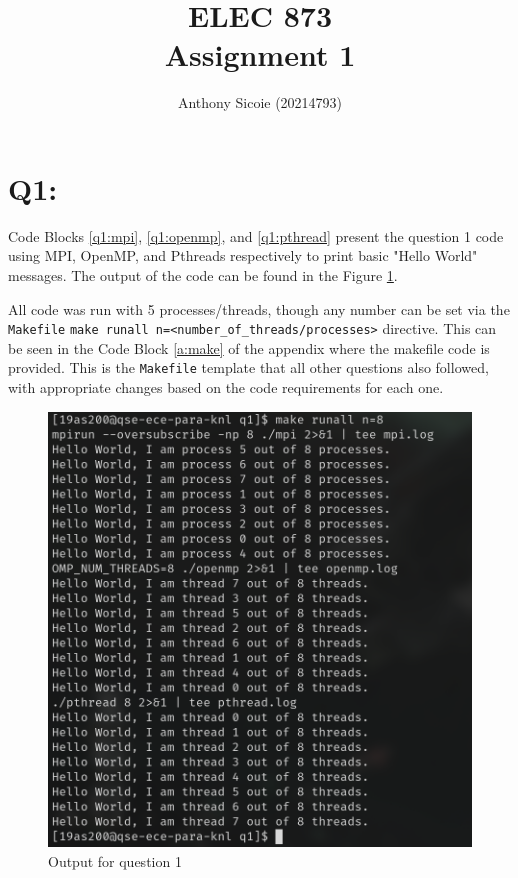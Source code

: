 \documentclass[11pt]{article}
\title{%
  ELEC 873 \\
Assignment 1}
\author{Anthony Sicoie (20214793)}
\begin{document}
\maketitle


\section*{Q1:}


Code Blocks \ref{q1:mpi}, \ref{q1:openmp}, and \ref{q1:pthread} present the question 1 code using MPI, OpenMP, and Pthreads respectively to print basic "Hello World" messages.
The output of the code can be found in the Figure \ref{fig:q1}.





All code was run with 5 processes/threads, though any number can be set via the \texttt{Makefile} \texttt{make runall n=<number\_of\_threads/processes>} directive. 
This can be seen in the Code Block \ref{a:make} of the appendix where the makefile code is provided.
This is the \texttt{Makefile} template that all other questions also followed, with appropriate changes based on the code requirements for each one.

\begin{figure}[ht]
\centering
    \includegraphics[width=\textwidth]{./images/q1.png}
\caption{Output for question 1}
\label{fig:q1}
\end{figure}
\end{document}
